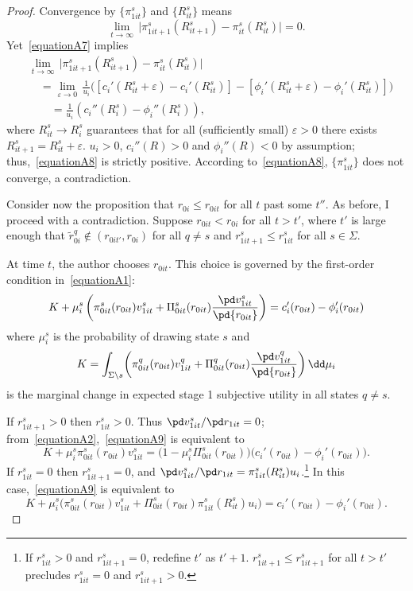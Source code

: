 \begin{proof}
Convergence by $\{\pi_{1it}^s\}$ and $\{R_{it}^s\}$ means
\begin{equation*}
	\lim_{t\rightarrow\infty}\,\Big|\pi_{1it+1}^s(R_{it+1}^s)-\pi_{it}^s(R_{it}^s)\Big|=0.
\end{equation*}
Yet~\autoref{equationA7} implies
\begin{align}\label{equationA8}
	&\lim_{t\rightarrow\infty}\,\Big|\pi_{1it+1}^s(R_{it+1}^s)-\pi_{it}^s(R_{it}^s)\Big|\nonumber\\
	&\quad=\lim_{\varepsilon\rightarrow0}\,\frac{1}{u_i}\Big(\left[c_i'(R_{it}^s+\varepsilon)-c_i'(R_{it}^s)\right]-\left[\phi_i'(R_{it}^s+\varepsilon)-\phi_i'(R_{it}^s)\right]\Big)\nonumber\\
	&\qquad=\frac{1}{u_i}\left(c_i''(R_i^s)-\phi_i''(R_i^s)\right),
\end{align}
where $R_{it}^s\rightarrow R_i^s$ guarantees that for all (sufficiently small) $\varepsilon>0$ there exists $R_{it+1}^s=R_{it}^s+\varepsilon$. $u_i>0$, $c_i''(R)>0$ and $\phi_i''(R)<0$ by assumption; thus,~\autoref{equationA8} is strictly positive. According to~\autoref{equationA8}, $\{\pi_{1it}^s\}$ does not converge, a contradiction.

Consider now the proposition that $r_{0i}\le r_{0it}$ for all $t$ past some $t''$. As before, I proceed with a contradiction. Suppose $r_{0it}<r_{0i}$ for all $t>t'$, where $t'$ is large enough that $\widetilde r_{0i}^q\not\in(r_{0it'},r_{0i})$ for all $q\ne s$ and $r_{1it+1}^s\le r_{1it}^s$ for all $s\in\Sigma$.

At time $t$, the author chooses $r_{0it}$. This choice is governed by the first-order condition in~\autoref{equationA1}:
\begin{equation}\label{equationA9}
	K+\mu_i^s\left(\pi_{0it}^s(r_{0it})v_{1it}^s+\Pi_{0it}^s(r_{0it})\frac{\pd v_{1it}^s}{\pd{r_{0it}}}\right)=c_i'(r_{0it})-\phi_i'(r_{0it})
\end{equation}
where $\mu_i^s$ is the probability of drawing state $s$ and $$K=\int_{\Sigma\setminus s}\!\left(\pi_{0it}^q(r_{0it})v_{1it}^q+\Pi_{0it}^q(r_{0it})\frac{\pd v_{1it}^q}{\pd{r_{0it}}}\right)\dd\mu_i$$ is the marginal change in expected stage 1 subjective utility in all states $q\ne s$.

If $r_{1it+1}^s>0$ then $r_{1it}^s>0$. Thus $\pd v_{1it}^s/\pd r_{1it}=0$; from~\autoref{equationA2},~\autoref{equationA9} is equivalent to
\begin{equation}\label{equationA10}
	K+\mu_i^s\pi_{0it}^s(r_{0it})v_{1it}^s=\Big(1-\mu_i^s\Pi_{0it}^s(r_{0it})\Big)\Big(c_i'(r_{0it})-\phi_i'(r_{0it})\Big).
\end{equation}
If $r_{1it}^s=0$ then $r_{1it+1}^s=0$, and $\pd v_{1it}^s/\pd r_{1it}=\pi_{1it}^s(R_{it}^s)u_i$.\footnote{If $r_{1it}^s>0$ and $r_{1it+1}^s=0$, redefine $t'$ as $t'+1$. $r_{1it+1}^s\le r_{1it+1}^s$ for all $t>t'$ precludes $r_{1it}^s=0$ and $r_{1it+1}^s>0$.} In this case,~\autoref{equationA9} is equivalent to
\begin{equation}\label{equationA11}
	K+\mu_i^s\Big(\pi_{0it}^s(r_{0it})v_{1it}^s+\Pi_{0it}^s(r_{0it})\pi_{1it}^s(R_{it}^s)u_i\Big)=c_i'(r_{0it})-\phi_i'(r_{0it}).
\end{equation}


\end{proof}
